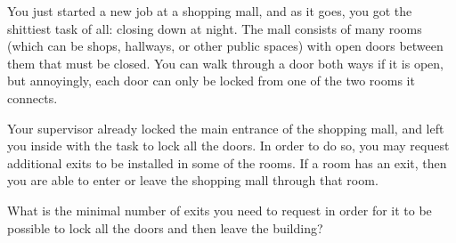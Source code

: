 





You just started a new job at a shopping mall, and as it goes, you got the
shittiest task of all: closing down at night.
The mall consists of many rooms (which can be shops, hallways, or other public spaces)
with open doors between them that must be closed.
You can walk through a door both ways if it is open, but annoyingly, each door
can only be locked from one of the two rooms it connects.

Your supervisor already locked the main entrance of the shopping mall,
and left you inside with the task to lock all the doors.
In order to do so, you may request additional exits to be installed in some of the rooms.
If a room has an exit, then you are able to enter or leave the shopping mall through that room.

What is the minimal number of exits you need to request in order for it to be possible to lock all the doors and then leave the building?


